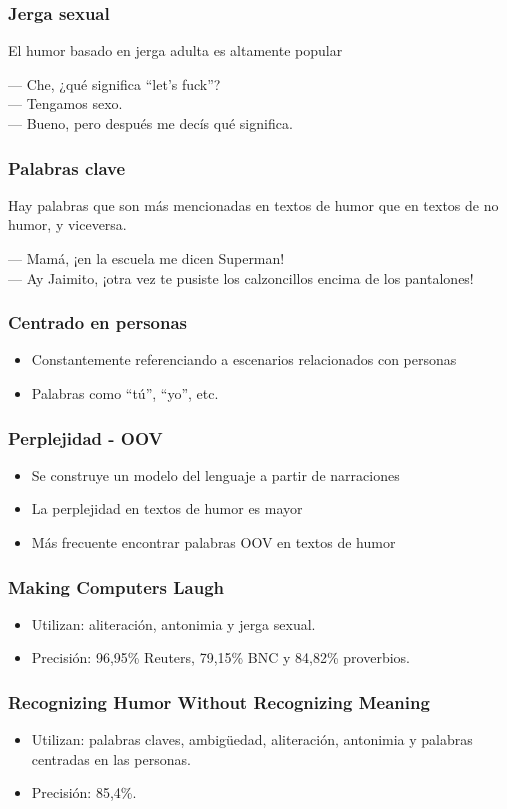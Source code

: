 \begin{frame}
    \frametitle{Jerga sexual}
    
    El humor basado en jerga adulta es altamente popular
    \begin{example}
        --- Che, ¿qué significa “let’s fuck”? \\
        --- Tengamos sexo. \\
        --- Bueno, pero después me decís qué significa.
    \end{example}
\end{frame}

\begin{frame}
    \frametitle{Palabras clave}
    
    Hay palabras que son más mencionadas en textos de humor que en textos de no humor, y viceversa.
    \begin{example}
        --- Mamá, ¡en la escuela me dicen Superman! \\
        --- Ay Jaimito, ¡otra vez te pusiste los calzoncillos encima de los pantalones!
    \end{example}
\end{frame}

\begin{frame}
    \frametitle{Centrado en personas}
    
    \begin{itemize}
        \item Constantemente referenciando a escenarios relacionados con personas
        \item Palabras como “tú”, “yo”, etc.
    \end{itemize}
\end{frame}

\begin{frame}
    \frametitle{Perplejidad - OOV}
    
    \begin{itemize}
        \item Se construye un modelo del lenguaje a partir de narraciones
        \item La perplejidad en textos de humor es mayor
        \item Más frecuente encontrar palabras OOV en textos de humor
    \end{itemize}
\end{frame}

\begin{frame}
    \frametitle{Making Computers Laugh}
    
    \begin{itemize}
        \item Utilizan: aliteración, antonimia y jerga sexual.
        \item Precisión: 96,95\% Reuters, 79,15\% BNC y 84,82\% proverbios.
    \end{itemize}
\end{frame}

\begin{frame}
    \frametitle{Recognizing Humor Without Recognizing Meaning}
    
    \begin{itemize}
        \item Utilizan: palabras claves, ambigüedad, aliteración, antonimia y palabras centradas en las personas.
        \item Precisión: 85,4\%.
    \end{itemize}
\end{frame}
